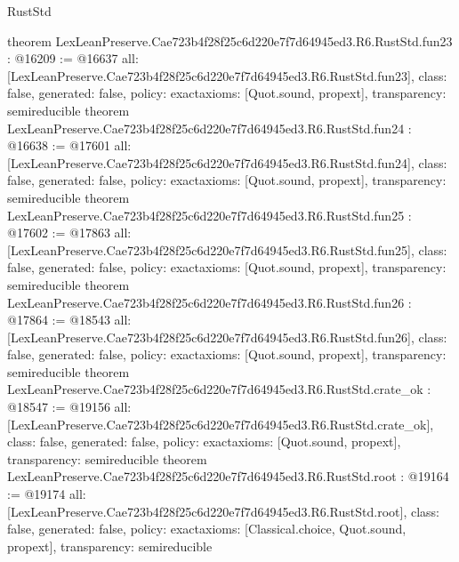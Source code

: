 \begin{lexlean}{RustStd}
\begin{coremodule}
{}
theorem LexLeanPreserve.Cae723b4f28f25c6d220e7f7d64945ed3.R6.RustStd.fun23 : @16209 := @16637 {
  all: [LexLeanPreserve.Cae723b4f28f25c6d220e7f7d64945ed3.R6.RustStd.fun23],
  class: false,
  generated: false,
  policy: exact{axioms: [Quot.sound, propext]},
  transparency: semireducible
}
theorem LexLeanPreserve.Cae723b4f28f25c6d220e7f7d64945ed3.R6.RustStd.fun24 : @16638 := @17601 {
  all: [LexLeanPreserve.Cae723b4f28f25c6d220e7f7d64945ed3.R6.RustStd.fun24],
  class: false,
  generated: false,
  policy: exact{axioms: [Quot.sound, propext]},
  transparency: semireducible
}
theorem LexLeanPreserve.Cae723b4f28f25c6d220e7f7d64945ed3.R6.RustStd.fun25 : @17602 := @17863 {
  all: [LexLeanPreserve.Cae723b4f28f25c6d220e7f7d64945ed3.R6.RustStd.fun25],
  class: false,
  generated: false,
  policy: exact{axioms: [Quot.sound, propext]},
  transparency: semireducible
}
theorem LexLeanPreserve.Cae723b4f28f25c6d220e7f7d64945ed3.R6.RustStd.fun26 : @17864 := @18543 {
  all: [LexLeanPreserve.Cae723b4f28f25c6d220e7f7d64945ed3.R6.RustStd.fun26],
  class: false,
  generated: false,
  policy: exact{axioms: [Quot.sound, propext]},
  transparency: semireducible
}
theorem LexLeanPreserve.Cae723b4f28f25c6d220e7f7d64945ed3.R6.RustStd.crate_ok : @18547 := @19156 {
  all: [LexLeanPreserve.Cae723b4f28f25c6d220e7f7d64945ed3.R6.RustStd.crate_ok],
  class: false,
  generated: false,
  policy: exact{axioms: [Quot.sound, propext]},
  transparency: semireducible
}
theorem LexLeanPreserve.Cae723b4f28f25c6d220e7f7d64945ed3.R6.RustStd.root : @19164 := @19174 {
  all: [LexLeanPreserve.Cae723b4f28f25c6d220e7f7d64945ed3.R6.RustStd.root],
  class: false,
  generated: false,
  policy: exact{axioms: [Classical.choice, Quot.sound, propext]},
  transparency: semireducible
}


\end{coremodule}
\end{lexlean}
